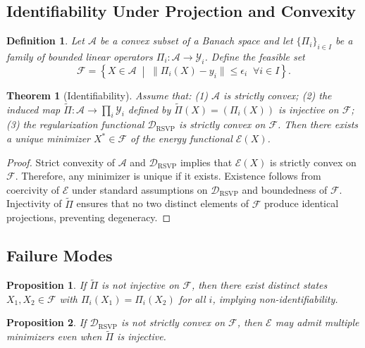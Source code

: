 \documentclass[12pt, oneside]{article}
\newtheorem{definition}{Definition}
\newtheorem{theorem}{Theorem}
\newtheorem{proposition}{Proposition}
\begin{document}
\subsection{Identifiability Under Projection and Convexity}

\begin{definition}
Let $\mathcal{A}$ be a convex subset of a Banach space and let $\{\Pi_i\}_{i \in I}$ be a family of bounded linear operators $\Pi_i : \mathcal{A} \to \mathcal{Y}_i$. Define the feasible set
\[
\mathcal{F} = \left\{ X \in \mathcal{A} \;\middle|\; \|\Pi_i(X) - y_i\| \leq \epsilon_i \;\; \forall i \in I \right\}.
\]
\end{definition}

\begin{theorem}[Identifiability]
Assume that: (1) $\mathcal{A}$ is strictly convex; (2) the induced map $\tilde{\Pi} : \mathcal{A} \to \prod_i \mathcal{Y}_i$ defined by $\tilde{\Pi}(X) = (\Pi_i(X))$ is injective on $\mathcal{F}$; (3) the regularization functional $\mathcal{D}_{\text{RSVP}}$ is strictly convex on $\mathcal{F}$.
Then there exists a unique minimizer $X^\ast \in \mathcal{F}$ of the energy functional $\mathcal{E}(X)$.
\end{theorem}

\begin{proof}
Strict convexity of $\mathcal{A}$ and $\mathcal{D}_{\text{RSVP}}$ implies that $\mathcal{E}(X)$ is strictly convex on $\mathcal{F}$. Therefore, any minimizer is unique if it exists. Existence follows from coercivity of $\mathcal{E}$ under standard assumptions on $\mathcal{D}_{\text{RSVP}}$ and boundedness of $\mathcal{F}$. Injectivity of $\tilde{\Pi}$ ensures that no two distinct elements of $\mathcal{F}$ produce identical projections, preventing degeneracy.
\end{proof}

\subsection{Failure Modes}

\begin{proposition}
If $\tilde{\Pi}$ is not injective on $\mathcal{F}$, then there exist distinct states $X_1, X_2 \in \mathcal{F}$ with $\Pi_i(X_1) = \Pi_i(X_2)$ for all $i$, implying non-identifiability.
\end{proposition}

\begin{proposition}
If $\mathcal{D}_{\text{RSVP}}$ is not strictly convex on $\mathcal{F}$, then $\mathcal{E}$ may admit multiple minimizers even when $\tilde{\Pi}$ is injective.
\end{proposition}
\end{document}
